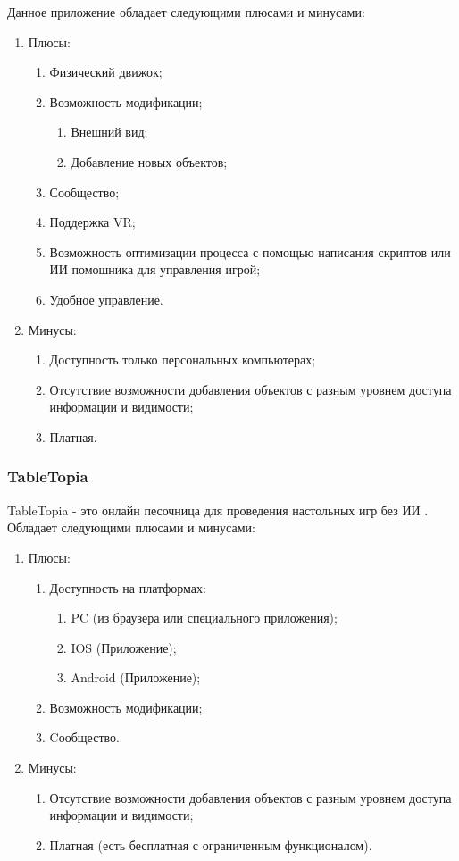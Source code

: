 	Данное приложение обладает следующими плюсами и минусами:
	\begin{enumerate}	
		\item Плюсы:
		\begin{enumerate}
			\item Физический движок;
			\item Возможность модификации;
			\begin{enumerate}
				\item Внешний вид;
				\item Добавление новых объектов;
			\end{enumerate}
			\item Сообщество;
			\item Поддержка VR;
			\item Возможность оптимизации процесса с помощью написания скриптов или ИИ помошника для управления игрой;
			\item Удобное управление.
		\end{enumerate}
		
		\item Минусы:
		\begin{enumerate}
			\item Доступность только персональных компьютерах;
			\item Отсутствие возможности добавления объектов с разным уровнем доступа информации и видимости;
			\item Платная.
		\end{enumerate}
	\end{enumerate}
	
	\subsubsection{TableTopia}
	
	TableTopia - это онлайн песочница для проведения настольных игр без ИИ \cite{4}. Обладает следующими плюсами и минусами:
	\begin{enumerate}
		\item Плюсы:
		\begin{enumerate}
			\item Доступность на платформах:
			\begin{enumerate}
				\item PC (из браузера или специального приложения);
				\item IOS (Приложение);
				\item Android (Приложение);
			\end{enumerate}
			\item Возможность модификации;
			\item Cообщество.
		\end{enumerate}
	
		\item Минусы:
		\begin{enumerate}
			\item Отсутствие возможности добавления объектов с разным уровнем доступа информации и видимости;
			\item Платная (есть бесплатная с ограниченным функционалом).
		\end{enumerate}
	\end{enumerate}
	
